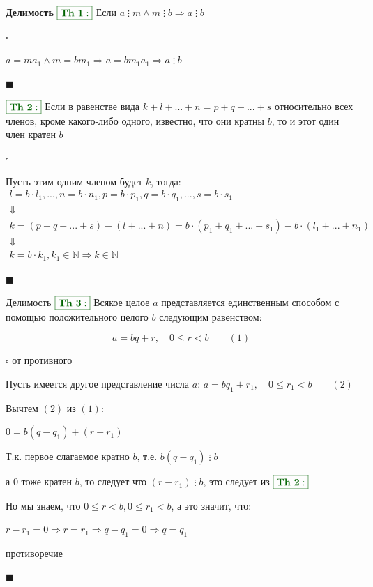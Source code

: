 \documentclass[8pt, aspectratio=169]{beamer}
\newcommand{\Th}[1]{{\color{darkgreen}\boxed{\color{darkgreen}\mathbf{Th~#1:}}}}
\begin{document}
\begin{frame}{\textbf{Делимость}}
$\Th{1}$ Если $a \mathbin{\vdots} m \land m \mathbin{\vdots} b \Rightarrow a \mathbin{\vdots} b$

$\square$

$a=ma_1 \land m = bm_1 \Rightarrow a = bm_1a_1 \Rightarrow a \mathbin{\vdots} b$

$\blacksquare$

$\Th{2}$ Если в равенстве вида $k + l + ... + n = p + q + ... + s$ относительно всех членов, кроме какого-либо одного, известно, что они кратны $b$, то и этот один член кратен $b$

$\square$

Пусть этим одним членом будет $k$, тогда:
\begin{gather*}
l = b \cdot l_1, ..., n = b \cdot n_1, p=b \cdot p_1, q=b \cdot q_1, ..., s=b \cdot s_1 \\
\Downarrow \\
k = (p + q + ... + s) - (l + ... + n) = b \cdot (p_1 + q_1 + ... + s_1) - b \cdot (l_1 + ... + n_1) \\
\Downarrow \\
k = b\cdot k_1, k_1 \in \mathbb{N} \Rightarrow k \in \mathbb{N}
\end{gather*}

$\blacksquare$

\end{frame}

\begin{frame}{Делимость}
$\Th{3}$ Всякое целое $a$ представляется единственным способом
с помощью положительного целого $b$ следующим равенством:

\[
a = bq + r, \quad 0 \le r < b \qquad (1)
\]

$\square$ от противного

Пусть имеется другое представление числа $a$:
$a = bq_1 + r_1, \quad 0 \le r_1 < b \qquad (2)$

Вычтем $(2)$ из $(1)$:

$0 = b(q - q_1) + (r - r_1)$

Т.к. первое слагаемое кратно $b$, т.е. $b(q - q_1)\mathbin{\vdots} b$

а $0$ тоже кратен $b$, то следует что $(r - r_1) \mathbin{\vdots} b$, это следует из $\Th{2}$

Но мы знаем, что $0 \le r < b, 0 \le r_1 < b$, а это значит, что:

$r - r_1 = 0 \Rightarrow r = r_1 \Rightarrow q - q_1 = 0 \Rightarrow q = q_1$

противоречие

$\blacksquare$
\end{frame}
\end{document}
